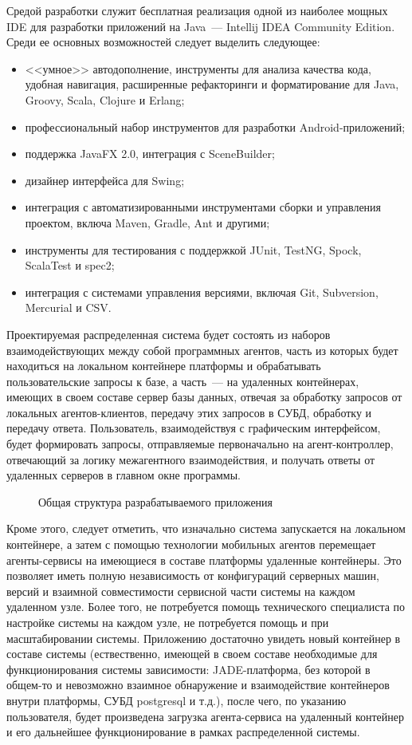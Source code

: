 Средой разработки служит бесплатная реализация одной из наиболее мощных IDE для разработки приложений на Java~--- Intellij IDEA Community Edition. Среди ее основных возможностей следует выделить следующее:
\begin{itemize}
\item <<умное>> автодополнение, инструменты для анализа качества кода, удобная навигация, расширенные рефакторинги и форматирование для Java, Groovy, Scala, Clojure и Erlang;
\item профессиональный набор инструментов для разработки Android-приложений;
\item поддержка JavaFX 2.0, интеграция с SceneBuilder;
\item дизайнер интерфейса для Swing;
\item интеграция с автоматизированными инструментами сборки и управления проектом, включа Maven, Gradle, Ant и другими;
\item инструменты для тестирования с поддержкой JUnit, TestNG, Spock, ScalaTest и spec2;
\item интеграция с системами управления версиями, включая Git, Subversion, Mercurial и CSV.
\end{itemize}

	Проектируемая распределенная система будет состоять из наборов взаимодействующих между собой программных агентов, часть из которых будет находиться на локальном контейнере платформы и обрабатывать пользовательские  запросы к базе, а часть~--- на удаленных контейнерах, имеющих в своем составе сервер базы данных, отвечая за обработку запросов от локальных агентов-клиентов, передачу этих запросов в СУБД, обработку и передачу ответа. Пользователь, взаимодействуя с графическим интерфейсом, будет формировать запросы, отправляемые первоначально на агент-контроллер, отвечающий за логику  межагентного взаимодействия, и получать ответы от удаленных серверов в главном окне программы.

\begin{figure}[h!]
\caption{Общая структура разрабатываемого приложения}
\label{3:common-scheme}
\end{figure}

Кроме этого, следует отметить, что изначально система запускается на локальном контейнере, а затем с помощью технологии мобильных агентов перемещает агенты-сервисы на имеющиеся в составе платформы удаленные контейнеры. Это позволяет иметь полную независимость от конфигураций серверных машин, версий и взаимной совместимости сервисной части системы на каждом удаленном узле. Более того, не потребуется помощь технического специалиста по настройке системы на каждом узле, не потребуется помощь и при масштабировании системы. Приложению достаточно увидеть новый контейнер в составе системы (ествественно, имеющей в своем составе необходимые для функционирования системы зависимости: JADE-платформа, без которой в общем-то и невозможно взаимное обнаружение и взаимодействие контейнеров внутри платформы, СУБД postgresql и т.д.), после чего, по указанию пользователя, будет произведена загрузка агента-сервиса на удаленный контейнер и его дальнейшее функционирование в рамках распределенной системы.

